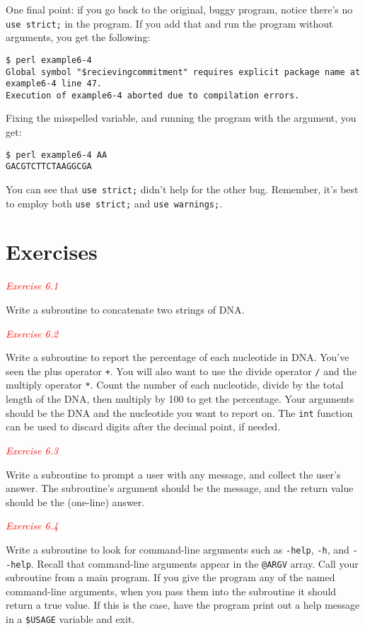 One final point: if you go back to the original, buggy program, notice there's no \verb|use strict;| in the program. If you add that and run the program without arguments, you get the following: 

\begin{lstlisting}
$ perl example6-4   
Global symbol "$recievingcommitment" requires explicit package name at example6-4 line 47.
Execution of example6-4 aborted due to compilation errors.
\end{lstlisting}

Fixing the misspelled variable, and running the program with the argument, you get:

\begin{lstlisting}
$ perl example6-4 AA
GACGTCTTCTAAGGCGA
\end{lstlisting}

You can see that \verb|use strict;| didn't help for the other bug. Remember, it's best to employ both \verb|use strict;| and \verb|use warnings;|.

\section{Exercises}
\textcolor{red}{\textit{Exercise 6.1}}
\begin{adjustwidth}{1cm}{}
Write a subroutine to concatenate two strings of DNA.
\end{adjustwidth}

\textcolor{red}{\textit{Exercise 6.2}}
\begin{adjustwidth}{1cm}{}
Write a subroutine to report the percentage of each nucleotide in DNA. You've seen the plus operator \verb|+|. You will also want to use the divide operator \verb|/| and the multiply operator \verb|*|. Count the number of each nucleotide, divide by the total length of the DNA, then multiply by 100 to get the percentage. Your arguments should be the DNA and the nucleotide you want to report on. The \verb|int| function can be used to discard digits after the decimal point, if needed.
\end{adjustwidth}

\textcolor{red}{\textit{Exercise 6.3}}
\begin{adjustwidth}{1cm}{}
Write a subroutine to prompt a user with any message, and collect the user's answer. The subroutine's argument should be the message, and the return value should be the (one-line) answer. 
\end{adjustwidth}

\textcolor{red}{\textit{Exercise 6.4}}
\begin{adjustwidth}{1cm}{}
Write a subroutine to look for command-line arguments such as \verb|-help|, \verb|-h|, and \verb|--help|. Recall that command-line arguments appear in the \verb|@ARGV| array. Call your subroutine from a main program. If you give the program any of the named command-line arguments, when you pass them into the subroutine it should return a true value. If this is the case, have the program print out a help message in a \verb|$USAGE| variable and exit. 
\end{adjustwidth}


